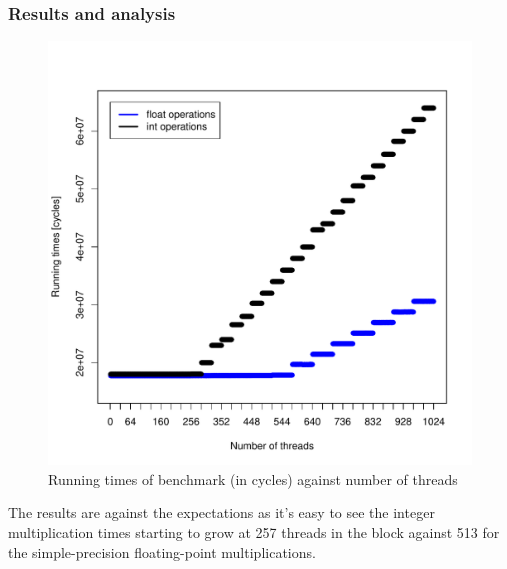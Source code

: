\documentclass{article}
\def \scalingfactor{.8}
\begin{document}
	\subsubsection{Results and analysis}
    \begin{figure}[h]
    	\centering
		\vspace{-20pt}
	    \includegraphics[width=\scalingfactor\linewidth]{"graphics/float_vs_int_running_times"}
		\vspace{-15pt}
        \caption{Running times of benchmark (in cycles) against number of threads}
    \end{figure}
	
    The results are against the expectations as it's easy to see the integer
    multiplication times starting to grow at 257 threads in the block against
    513 for the simple-precision floating-point multiplications.
    
\end{document}
